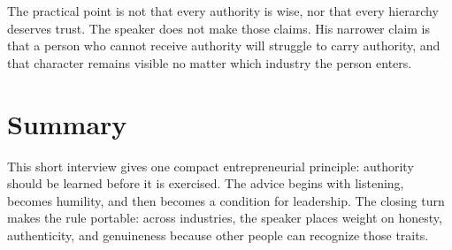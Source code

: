 The practical point is not that every authority is wise, nor that every hierarchy deserves trust. The speaker does not make those claims. His narrower claim is that a person who cannot receive authority will struggle to carry authority, and that character remains visible no matter which industry the person enters.

\section{Summary}

This short interview gives one compact entrepreneurial principle: authority should be learned before it is exercised. The advice begins with listening, becomes humility, and then becomes a condition for leadership. The closing turn makes the rule portable: across industries, the speaker places weight on honesty, authenticity, and genuineness because other people can recognize those traits.